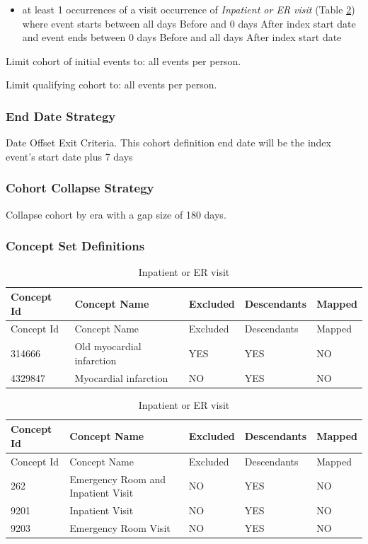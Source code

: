 \documentclass[11pt]{book}
\providecommand{\tightlist}{%
  \setlength{\itemsep}{0pt}\setlength{\parskip}{0pt}}
\theoremstyle{definition}
\theoremstyle{definition}
\theoremstyle{definition}
\theoremstyle{remark}
\begin{document}
\begin{itemize}
\tightlist
\item
  at least 1 occurrences of a visit occurrence of \emph{Inpatient or ER
  visit} (Table \ref{tab:inpatientOrErAmi}) where event starts between
  all days Before and 0 days After index start date and event ends
  between 0 days Before and all days After index start date
\end{itemize}

Limit cohort of initial events to: all events per person.

Limit qualifying cohort to: all events per person.

\subsubsection*{End Date Strategy}\label{end-date-strategy-2}

Date Offset Exit Criteria. This cohort definition end date will be the
index event's start date plus 7 days

\subsubsection*{Cohort Collapse
Strategy}\label{cohort-collapse-strategy-2}

Collapse cohort by era with a gap size of 180 days.

\subsubsection*{Concept Set
Definitions}\label{concept-set-definitions-2}

\begin{longtable}[]{@{}lllll@{}}
\caption{\label{tab:ami} Inpatient or ER visit}\tabularnewline
\toprule
Concept Id & Concept Name & Excluded & Descendants &
Mapped\tabularnewline
\midrule
\endfirsthead
\toprule
Concept Id & Concept Name & Excluded & Descendants &
Mapped\tabularnewline
\midrule
\endhead
314666 & Old myocardial infarction & YES & YES & NO\tabularnewline
4329847 & Myocardial infarction & NO & YES & NO\tabularnewline
\bottomrule
\end{longtable}

\begin{longtable}[]{@{}lllll@{}}
\caption{\label{tab:inpatientOrErAmi} Inpatient or ER visit}\tabularnewline
\toprule
Concept Id & Concept Name & Excluded & Descendants &
Mapped\tabularnewline
\midrule
\endfirsthead
\toprule
Concept Id & Concept Name & Excluded & Descendants &
Mapped\tabularnewline
\midrule
\endhead
262 & Emergency Room and Inpatient Visit & NO & YES & NO\tabularnewline
9201 & Inpatient Visit & NO & YES & NO\tabularnewline
9203 & Emergency Room Visit & NO & YES & NO\tabularnewline
\bottomrule
\end{longtable}
\end{document}
